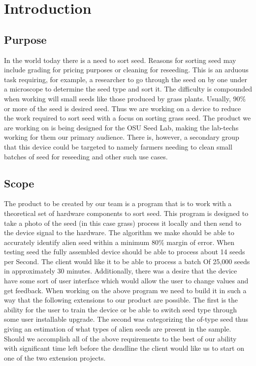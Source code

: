 \documentclass[onecolumn, draftclsnofoot,10pt, compsoc]{IEEEtran}
\begin{document}

\section{Introduction}

\subsection{Purpose}
In the world today there is a need to sort seed.
Reasons for sorting seed may include grading for pricing purposes or cleaning for reseeding.
This is an arduous task requiring, for example, a researcher to go through the seed on by one under a microscope to determine the seed type and sort it.
The difficulty is compounded when working will small seeds like those produced by grass plants.
Usually, 90\% or more of the seed is desired seed.
Thus we are working on a device to reduce the work required to sort seed with a focus on sorting grass seed.
The product we are working on is being designed for the OSU Seed Lab, making the lab-techs working for them our primary audience.
There is, however, a secondary group that this device could be targeted to namely farmers needing to clean small batches of seed for reseeding and other such use cases.

\subsection{Scope}
The product to be created by our team is a program that is to work with a theoretical set of hardware components to sort seed.
This program is designed to take a photo of the seed (in this case grass) process it locally and then send to the device signal to the hardware.
The algorithm we make should be able to accurately identify alien seed within a minimum 80\% margin of error.
When testing seed the fully assembled device should be able to process about 14 seeds per Second.
The client would like it to be able to process a batch Of 25,000 seeds in approximately 30 minutes.
Additionally, there was a desire that the device have some sort of user interface which would allow the user to change values and get feedback.
When working on the above program we need to build it in such a way that the following extensions to our product are possible.
The first is the ability for the user to train the device or be able to switch seed type through some user installable upgrade.
The second was categorizing the of-type seed thus giving an estimation of what types of alien seeds are present in the sample.
Should we accomplish all of the above requirements to the best of our ability with significant time left before the deadline the client would like us to start on one of the two extension projects.
\end{document}
